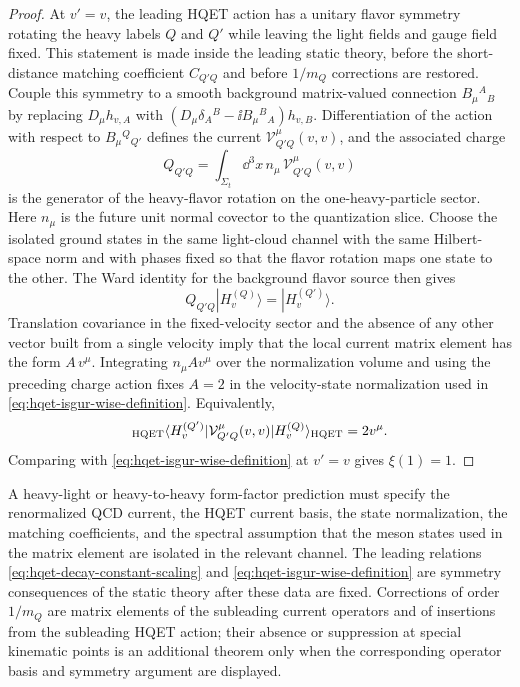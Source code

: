 \begin{proof}
At \(v'=v\), the leading HQET action has a unitary flavor symmetry rotating
the heavy labels \(Q\) and \(Q'\) while leaving the light fields and gauge
field fixed.  This statement is made inside the leading static theory, before
the short-distance matching coefficient \(C_{Q'Q}\) and before \(1/m_Q\)
corrections are restored.  Couple this symmetry to a smooth background
matrix-valued
connection \(B_\mu{}^A{}_B\) by replacing
\(D_\mu h_{v,A}\) with
\((D_\mu\delta_A{}^B-\ii B_\mu{}^B{}_A)h_{v,B}\).  Differentiation of the
action with respect to \(B_\mu{}^Q{}_{Q'}\) defines the current
\(\mathcal V^\mu_{Q'Q}(v,v)\), and the associated charge
\[
  Q_{Q'Q}
  =
  \int_{\Sigma_t}\dd^3x\,n_\mu\,\mathcal V^\mu_{Q'Q}(v,v)
\]
is the generator of the heavy-flavor rotation on the one-heavy-particle
sector.  Here \(n_\mu\) is the future unit normal covector to the quantization
slice.  Choose the isolated ground states in the same light-cloud channel with
the same Hilbert-space norm and with phases fixed so that the flavor
rotation maps one state to the other.  The Ward identity for the background
flavor source then gives
\[
  Q_{Q'Q}|H_v^{(Q)}\rangle=|H_v^{(Q')}\rangle .
\]
Translation covariance in the fixed-velocity sector and the absence of any
other vector built from a single velocity imply that the local current matrix
element has the form \(A\,v^\mu\).  Integrating \(n_\mu A v^\mu\) over the
normalization volume and using the preceding charge action fixes \(A=2\) in
the velocity-state normalization used in \eqref{eq:hqet-isgur-wise-definition}.
Equivalently,
\[
  {}_{\rm HQET}\langle H_v^{(Q')}|
  \mathcal V^\mu_{Q'Q}(v,v)
  |H_v^{(Q)}\rangle_{\rm HQET}
  =
  2v^\mu .
\]
Comparing with \eqref{eq:hqet-isgur-wise-definition} at \(v'=v\) gives
\(\xi(1)=1\).
\end{proof}

\begin{controlledapproximation}
\label{ca:hqet-heavy-light-current-expansion}
A heavy-light or heavy-to-heavy form-factor prediction must specify the
renormalized QCD current, the HQET current basis, the state normalization, the
matching coefficients, and the spectral assumption that the meson states used
in the matrix element are isolated in the relevant channel.  The leading
relations \eqref{eq:hqet-decay-constant-scaling} and
\eqref{eq:hqet-isgur-wise-definition} are symmetry consequences of the static
theory after these data are fixed.  Corrections of order \(1/m_Q\) are matrix
elements of the subleading current operators and of insertions from the
subleading HQET action; their absence or suppression at special kinematic
points is an additional theorem only when the corresponding operator basis and
symmetry argument are displayed.
\end{controlledapproximation}

